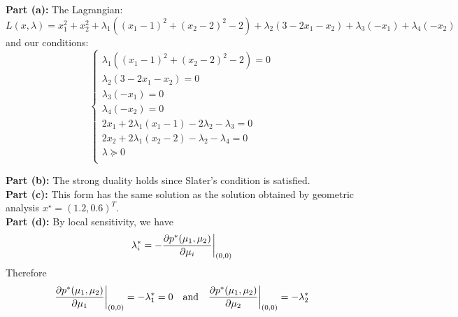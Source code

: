 \documentclass[11pt]{article}
\begin{document}
\begin{homeworkProblem}
    \textbf{Part (a):} The Lagrangian:
    \[
        L(x, \lambda) = x_1^2 + x_2^2 + \lambda_1 \left( (x_1 - 1)^2 + (x_2 - 2)^2 - 2 \right) + \lambda_2 (3 - 2x_1 - x_2) + \lambda_3 (-x_1) + \lambda_4 (-x_2)
    \]
    and our conditions:
    \[
        \begin{cases}
            \lambda_1 \left( (x_1 - 1)^2 + (x_2 - 2)^2 - 2 \right) = 0 \\
            \lambda_2 (3 - 2x_1 - x_2) = 0                             \\
            \lambda_3 (-x_1) = 0                                       \\
            \lambda_4 (-x_2) = 0                                       \\
            2x_1 + 2 \lambda_1(x_1 - 1) - 2 \lambda_2 - \lambda_3 = 0  \\
            2x_2 + 2 \lambda_1(x_2 - 2) - \lambda_2 - \lambda_4 = 0    \\
            \lambda \succeq 0                                          \\
        \end{cases}
    \]

    \pagebreak

    \textbf{Part (b):} The strong duality holds since Slater's condition is satisfied. \\

    \textbf{Part (c):} This form has the same solution as the solution obtained by geometric analysis $x^{\star} = (1.2, 0.6)^T$. \\

    \textbf{Part (d):} By local sensitivity, we have
    \[
        \lambda_i^* = - \frac{\partial p^*(\mu_1, \mu_2)}{\partial \mu_i} \bigg{|}_{(0, 0)}
    \]
    Therefore
    \[
        \frac{\partial p^*(\mu_1, \mu_2)}{\partial \mu_1} \bigg{|}_{(0, 0)} = -\lambda_1^* = 0 \quad \text{and} \quad \frac{\partial p^*(\mu_1, \mu_2)}{\partial \mu_2} \bigg{|}_{(0, 0)} = -\lambda_2^*
    \]


\end{homeworkProblem}

\pagebreak
\end{document}

